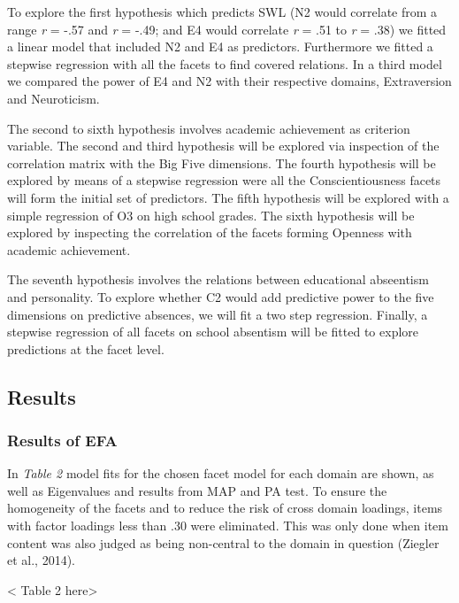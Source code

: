 \documentclass[,man,floatsintext]{apa6}
\begin{document}
To explore the first hypothesis which predicts SWL (N2 would correlate
from a range \emph{r} = -.57 and \emph{r} = -.49; and E4 would correlate
\emph{r} = .51 to \emph{r} = .38) we fitted a linear model that included
N2 and E4 as predictors. Furthermore we fitted a stepwise regression
with all the facets to find covered relations. In a third model we
compared the power of E4 and N2 with their respective domains,
Extraversion and Neuroticism.

The second to sixth hypothesis involves academic achievement as
criterion variable. The second and third hypothesis will be explored via
inspection of the correlation matrix with the Big Five dimensions. The
fourth hypothesis will be explored by means of a stepwise regression
were all the Conscientiousness facets will form the initial set of
predictors. The fifth hypothesis will be explored with a simple
regression of O3 on high school grades. The sixth hypothesis will be
explored by inspecting the correlation of the facets forming Openness
with academic achievement.

The seventh hypothesis involves the relations between educational
abseentism and personality. To explore whether C2 would add predictive
power to the five dimensions on predictive absences, we will fit a two
step regression. Finally, a stepwise regression of all facets on school
absentism will be fitted to explore predictions at the facet level.

\subsection{Results}\label{results}

\subsubsection{Results of EFA}\label{results-of-efa}

In \emph{Table 2} model fits for the chosen facet model for each domain
are shown, as well as Eigenvalues and results from MAP and PA test. To
ensure the homogeneity of the facets and to reduce the risk of cross
domain loadings, items with factor loadings less than .30 were
eliminated. This was only done when item content was also judged as
being non-central to the domain in question (Ziegler et al., 2014).

\vspace{5mm}

\textless{} Table 2 here\textgreater{}
\end{document}
